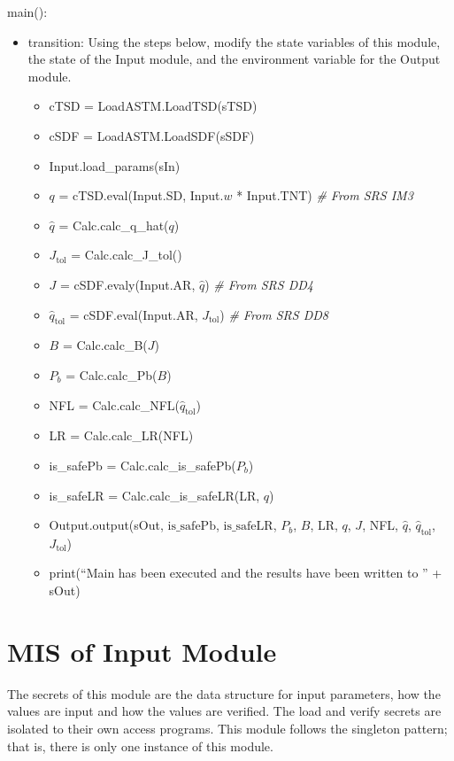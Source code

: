 \documentclass[12pt, titlepage]{article}
\begin{document}
\noindent main():
\begin{itemize}
\item transition: Using the steps below, modify the state variables of this
  module, the state of the Input module, and the environment variable for the
  Output module.
\begin{itemize}
\item cTSD = LoadASTM.LoadTSD(sTSD)
\item cSDF = LoadASTM.LoadSDF(sSDF)
\item Input.load\_params(sIn)
\item $q$ = cTSD.eval(Input.SD, Input.$w$ * Input.TNT) \textit{\# From SRS IM3}
\item $\hat{q}$ = Calc.calc\_q\_hat($q$)
\item $J_\text{tol}$ = Calc.calc\_J\_tol()
\item $J$ = cSDF.evaly(Input.AR, $\hat{q}$) \textit{\# From SRS DD4}
\item $\hat{q}_\text{tol}$ = cSDF.eval(Input.AR, $J_\text{tol}$) \textit{\# From SRS DD8}
\item $B$ = Calc.calc\_B($J$)
\item $P_b$ = Calc.calc\_Pb($B$)
\item NFL = Calc.calc\_NFL($\hat{q}_\text{tol}$)
\item LR = Calc.calc\_LR(NFL)
\item is\_safePb = Calc.calc\_is\_safePb($P_b$)
\item is\_safeLR = Calc.calc\_is\_safeLR(LR, $q$)
\item Output.output(sOut, $\mbox{is\_safePb}$, $\mbox{is\_safeLR}$, $P_b$, $B$, LR, $q$, $J$, NFL, $\hat{q}$,
         $\hat{q}_{\text{tol}}$, $J_{\text{tol}}$)
\item print(``Main has been executed and the results have been written to '' + sOut)
\end{itemize}
\end{itemize}

\newpage


\section{MIS of Input Module} \label{Input}

The secrets of this module are the data structure for input parameters, how the
values are input and how the values are verified.  The load and verify secrets
are isolated to their own access programs.  This module follows the singleton
pattern; that is, there is only one instance of this module.
\end{document}

